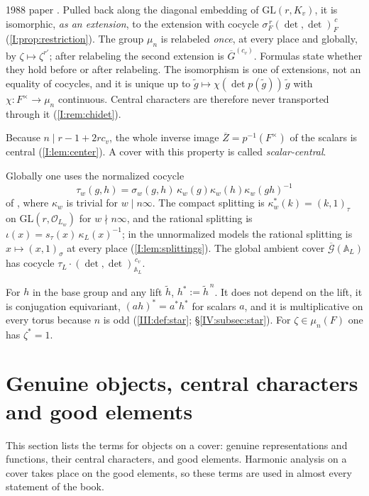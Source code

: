 \begin{description}
1988 paper \cite[equation~(4)]{JC26a}.  Pulled back along the diagonal
embedding of $\mathrm{GL}(r,K_v)$, it is isomorphic, \emph{as an
extension}, to the extension with cocycle
$\sigma_F^{\,r}(\det,\det)_F^{\,c}$ (\cref{I:prop:restriction}).  The
group $\mu_n$ is relabeled \emph{once}, at every place and globally,
by $\zeta\mapsto\zeta^{r'}$; after relabeling the second extension is
$\overline G^{(c_v)}$.  Formulas state whether they hold before or
after relabeling.  The isomorphism is one of extensions, not an
equality of cocycles, and it is unique up to
$\tilde g\mapsto\chi(\det p(\tilde g))\,\tilde g$ with
$\chi:F^\times\to\mu_n$ continuous.  Central characters are therefore
never transported through it (\cref{I:rem:chidet}).
\item[Scalar centrality] Because $n\mid r-1+2rc_v$, the whole inverse
image $\overline Z=p^{-1}(F^\times)$ of the scalars is central
(\cref{I:lem:center}).  A cover with this property is called
\emph{scalar-central}.
\item[Global normalization] Globally one uses the normalized cocycle
\[\tau_w(g,h)=\sigma_w(g,h)\,\kappa_w(g)\kappa_w(h)\kappa_w(gh)^{-1}\]
of \cite[\S2]{FK86}, where $\kappa_w$ is trivial for $w\mid
n\infty$.  The compact splitting is $\kappa^*_w(k)=(k,1)_\tau$ on
$\mathrm{GL}(r,\mathcal O_{L_w})$ for $w\nmid n\infty$, and the
rational splitting is $\iota(x)=s_\tau(x)\,\kappa_L(x)^{-1}$; in the
unnormalized models the rational splitting is $x\mapsto(x,1)_\sigma$
at every place (\cref{I:lem:splittings}).  The global ambient cover
$\overline{\mathcal G}(\mathbb A_L)$ has cocycle
$\tau_L\cdot(\det,\det)_{\mathbb A_L}^{\,c_v}$.
\item[Star map] For $h$ in the base group and any lift $\tilde h$,
$h^*:=\tilde h^{\,n}$.  It does not depend on the lift, it is
conjugation equivariant, $(ah)^*=a^*h^*$ for scalars $a$, and it is
multiplicative on every torus because $n$ is odd (\cref{III:def:star}; \S\ref{IV:subsec:star}).  For $\zeta\in\mu_n(F)$ one has
$\zeta^*=1$.
\end{description}

\section{Genuine objects, central characters and good elements}\label{gl:genuine}
This section lists the terms for objects on a cover: genuine representations and functions, their central characters, and good elements. Harmonic analysis on a cover takes place on the good elements, so these terms are used in almost every statement of the book.

